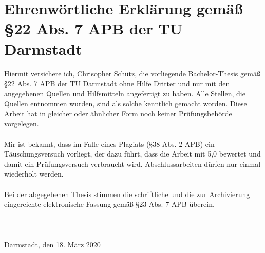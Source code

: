 %
%
%
%

\section*{Ehrenwörtliche Erklärung gemäß \S 22 Abs. 7 APB der TU Darmstadt}
Hiermit versichere ich, Chrisopher Schütz, die vorliegende Bachelor-Thesis gemäß
\S 22 Abs. 7 APB der TU Darmstadt ohne Hilfe Dritter und nur mit den angegebenen
Quellen und Hilfsmitteln angefertigt zu haben. Alle Stellen, die Quellen
entnommen wurden, sind als solche kenntlich gemacht worden. Diese Arbeit hat in
gleicher oder ähnlicher Form noch keiner Prüfungsbehörde vorgelegen. \\
\\
Mir ist bekannt, dass im Falle eines Plagiats (\S 38 Abs. 2 APB) ein
Täuschungsversuch vorliegt, der dazu führt, dass die Arbeit mit 5,0 bewertet und
damit ein Prüfungsversuch verbraucht wird. Abschlussarbeiten dürfen nur einmal 
wiederholt werden. \\
\\
Bei der abgegebenen Thesis stimmen die schriftliche und die zur Archivierung
eingereichte elektronische Fassung gemäß \S 23 Abs. 7 APB überein. \\
\\
\\
\\
\noindent Darmstadt, den 18. März 2020
\\
\normalsize


